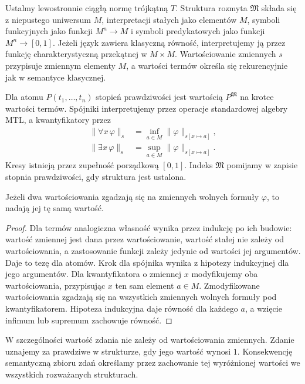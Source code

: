 \begin{definicja}\label{def:lst-fuzzy-structure}
Ustalmy lewostronnie ciągłą normę trójkątną $T$.
Struktura rozmyta $\mathfrak M$ składa się z niepustego
uniwersum $M$, interpretacji stałych jako elementów $M$,
symboli funkcyjnych jako funkcji $M^n\to M$ i symboli
predykatowych jako funkcji $M^n\to[0,1]$.
Jeżeli język zawiera klasyczną równość, interpretujemy ją
przez funkcję charakterystyczną przekątnej w $M\times M$.
Wartościowanie zmiennych $s$ przypisuje zmiennym elementy
$M$, a wartości termów określa się rekurencyjnie jak
w semantyce klasycznej.
\end{definicja}
Dla atomu $P(t_1,\ldots,t_n)$ stopień prawdziwości jest
wartością $P^{\mathfrak M}$ na krotce wartości termów.
Spójniki interpretujemy przez operacje standardowej algebry
MTL, a kwantyfikatory przez
\[
\begin{split}
 \|\forall x\,\varphi\|_s
 &=\inf_{a\in M}\|\varphi\|_{s[x\mapsto a]},\\
 \|\exists x\,\varphi\|_s
 &=\sup_{a\in M}\|\varphi\|_{s[x\mapsto a]}.
\end{split}
\]
Kresy istnieją przez zupełność porządkową $[0,1]$.
Indeks $\mathfrak M$ pomijamy w zapisie stopnia prawdziwości,
gdy struktura jest ustalona.

\begin{lemat}
\label{lem:lst-fuzzy-free-variables}
Jeżeli dwa wartościowania zgadzają się na zmiennych wolnych
formuły $\varphi$, to nadają jej tę samą wartość.
\end{lemat}
\begin{proof}
Dla termów analogiczna własność wynika przez indukcję
po ich budowie: wartość zmiennej jest dana przez wartościowanie,
wartość stałej nie zależy od wartościowania, a zastosowanie
funkcji zależy jedynie od wartości jej argumentów.
Daje to tezę dla atomów. Krok dla spójnika wynika z hipotezy
indukcyjnej dla jego argumentów. Dla kwantyfikatora o zmiennej
$x$ modyfikujemy oba wartościowania, przypisując $x$ ten sam
element $a\in M$. Zmodyfikowane wartościowania zgadzają się
na wszystkich zmiennych wolnych formuły pod kwantyfikatorem.
Hipoteza indukcyjna daje równość dla każdego $a$, a wzięcie
infimum lub supremum zachowuje równość.
\end{proof}
W szczególności wartość zdania nie zależy od wartościowania
zmiennych. Zdanie uznajemy za prawdziwe w strukturze, gdy
jego wartość wynosi $1$. Konsekwencję semantyczną zbioru zdań
określamy przez zachowanie tej wyróżnionej wartości
we wszystkich rozważanych strukturach.

